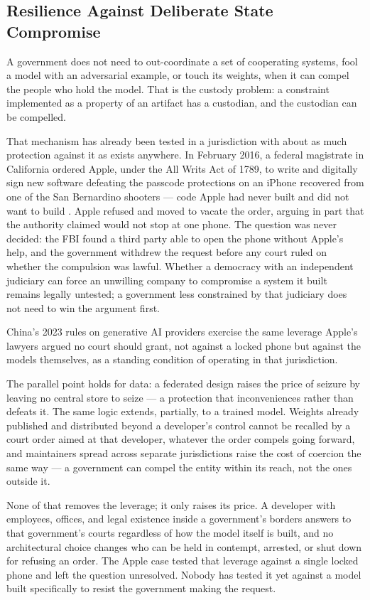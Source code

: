 \subsection{Resilience Against Deliberate State Compromise}
\label{sec:6.4.4}
A government does not need to out-coordinate a set of cooperating systems, fool a model with an adversarial example, or touch its weights, when it can compel the people who hold the model. That is the custody problem: a constraint implemented as a property of an artifact has a custodian, and the custodian can be compelled.

That mechanism has already been tested in a jurisdiction with about as much protection against it as exists anywhere. In February 2016, a federal magistrate in California ordered Apple, under the All Writs Act of 1789, to write and digitally sign new software defeating the passcode protections on an iPhone recovered from one of the San Bernardino shooters — code Apple had never built and did not want to build \autocite{pym2016applefbi}. Apple refused and moved to vacate the order, arguing in part that the authority claimed would not stop at one phone. The question was never decided: the FBI found a third party able to open the phone without Apple's help, and the government withdrew the request before any court ruled on whether the compulsion was lawful. Whether a democracy with an independent judiciary can force an unwilling company to compromise a system it built remains legally untested; a government less constrained by that judiciary does not need to win the argument first.

China's 2023 rules on generative AI providers exercise the same leverage Apple's lawyers argued no court should grant, not against a locked phone but against the models themselves, as a standing condition of operating in that jurisdiction.

The parallel point holds for data: a federated design raises the price of seizure by leaving no central store to seize — a protection that inconveniences rather than defeats it. The same logic extends, partially, to a trained model. Weights already published and distributed beyond a developer's control cannot be recalled by a court order aimed at that developer, whatever the order compels going forward, and maintainers spread across separate jurisdictions raise the cost of coercion the same way — a government can compel the entity within its reach, not the ones outside it.

None of that removes the leverage; it only raises its price. A developer with employees, offices, and legal existence inside a government's borders answers to that government's courts regardless of how the model itself is built, and no architectural choice changes who can be held in contempt, arrested, or shut down for refusing an order. The Apple case tested that leverage against a single locked phone and left the question unresolved. Nobody has tested it yet against a model built specifically to resist the government making the request.
